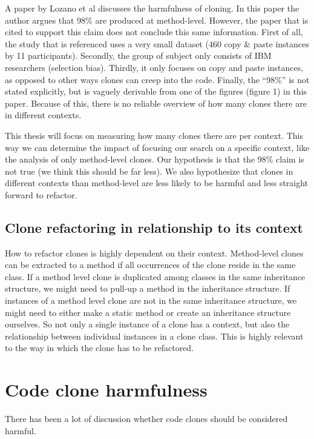 A paper by Lozano et al \cite{lozano2007evaluating} discusses the harmfulness of cloning. In this paper the author argues that 98\% are produced at method-level. However, the paper that is cited to support this claim \cite{bergman2004ethnographic} does not conclude this same information. First of all, the study that is referenced uses a very small dataset (460 copy \& paste instances by 11 participants). Secondly, the group of subject only consists of IBM researchers (selection bias). Thirdly, it only focuses on copy and paste instances, as opposed to other ways clones can creep into the code. Finally, the ``98\%'' is not stated explicitly, but is vaguely derivable from one of the figures (figure 1) in this paper. Because of this, there is no reliable overview of how many clones there are in different contexts.

This thesis will focus on measuring how many clones there are per context. This way we can determine the impact of focusing our search on a specific context, like the analysis of only method-level clones. Our hypothesis is that the 98\% claim is not true (we think this should be far less). We also hypothesize that clones in different contexts than method-level are less likely to be harmful and less straight forward to refactor.

\subsection{Clone refactoring in relationship to its context}
How to refactor clones is highly dependent on their context. Method-level clones can be extracted to a method \cite{kodhai2013method} if all occurrences of the clone reside in the same class. If a method level clone is duplicated among classes in the same inheritance structure, we might need to pull-up a method in the inheritance structure. If instances of a method level clone are not in the same inheritance structure, we might need to either make a static method or create an inheritance structure ourselves. So not only a single instance of a clone has a context, but also the relationship between individual instances in a clone class. This is highly relevant to the way in which the clone has to be refactored.

\section{Code clone harmfulness}
There has been a lot of discussion whether code clones should be considered harmful.


